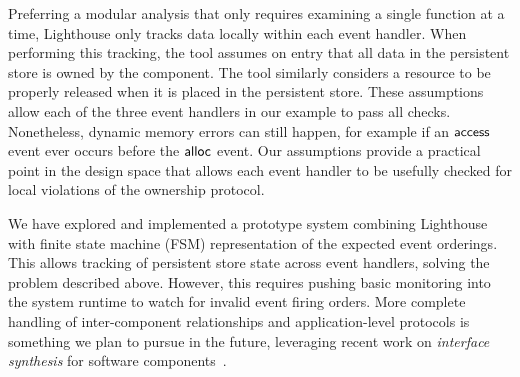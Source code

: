 Preferring a modular analysis that only requires examining a single function
at a time, Lighthouse only tracks data locally within each event handler.  
%
When performing this tracking, the tool assumes on entry that all data in the
persistent store is owned by the component.
%
The tool similarly considers a resource to be properly released when it is
placed in the persistent store.  
%
These assumptions allow each of the three event handlers in our example to
pass all checks.  
%
Nonetheless, dynamic memory errors can still happen, for example if an
${\mathsf{access}}$ event ever occurs before the ${\mathsf{alloc}}$ event.  
%
Our assumptions provide a practical point in the design space that allows each
event handler to be usefully checked for local violations of the ownership
protocol.  



We have explored and implemented a prototype system combining Lighthouse with
finite state machine (FSM) representation of the expected event orderings.
%
This allows tracking of persistent store state across event handlers, solving
the problem described above.
%
However, this requires pushing basic monitoring into the system runtime to
watch for invalid event firing orders.
%
More complete handling of inter-component relationships and application-level
protocols is something we plan to pursue in the future, leveraging recent work
on {\em interface synthesis} for software components~\cite{AlurPOPL05,HJM05}.


